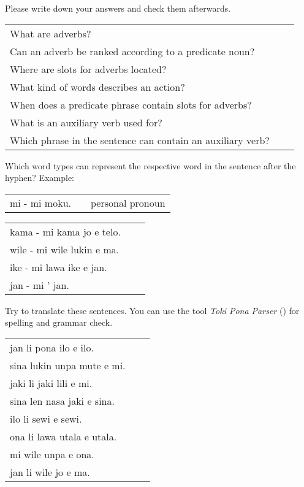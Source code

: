 Please write down your answers and check them afterwards.

\begin{supertabular}{p{5,5cm}|ll}
    What are adverbs?                                           &  & \\ %
    Can an adverb be ranked according to a predicate noun?      &  & \\ %
    Where are slots for adverbs located?                        &  & \\ %
    What kind of words describes an action?                     &  & \\ %
    When does a predicate phrase contain slots for adverbs?     &  & \\ %
    What is an auxiliary verb used for?                         &  & \\ %
    Which phrase in the sentence can contain an auxiliary verb? &  & \\ %
\end{supertabular}

Which word types can represent the respective word in the sentence after the hyphen?
Example:

\begin{supertabular}{p{5,5cm}|ll}
    mi - mi moku. &  & personal pronoun \\ %
\end{supertabular}

\begin{supertabular}{p{5,5cm}|ll}
    kama - mi kama jo e telo.  &  & \\ %
    wile - mi wile lukin e ma. &  & \\ %
    ike - mi lawa ike e jan.   &  & \\ %
    jan - mi ' jan.            &  & \\ %
\end{supertabular}

Try to translate these sentences.
You can use the tool \textit{Toki Pona Parser} (\cite{www:rowa:02}) for spelling and grammar check.

\begin{supertabular}{p{5,5cm}|ll}
    jan li pona ilo e ilo.     &  & \\ %
    sina lukin unpa mute e mi. &  & \\ %
    jaki li jaki lili e mi.    &  & \\ %
    sina len nasa jaki e sina. &  & \\ %
    ilo li sewi e sewi.        &  & \\ %
    ona li lawa utala e utala. &  & \\ %
    mi wile unpa e ona.        &  & \\ %
    jan li wile jo e ma.       &  & \\ %
\end{supertabular}

